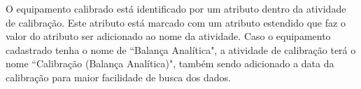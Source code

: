 O equipamento calibrado está identificado por um atributo dentro da atividade de calibração. Este atributo está marcado com um atributo estendido que faz o valor do atributo ser adicionado ao nome da atividade. Caso o equipamento cadastrado tenha o nome de ``Balança Analítica", a atividade de calibração terá o nome ``Calibração (Balança Analítica)", também sendo adicionado a data da calibração para maior facilidade de busca dos dados.